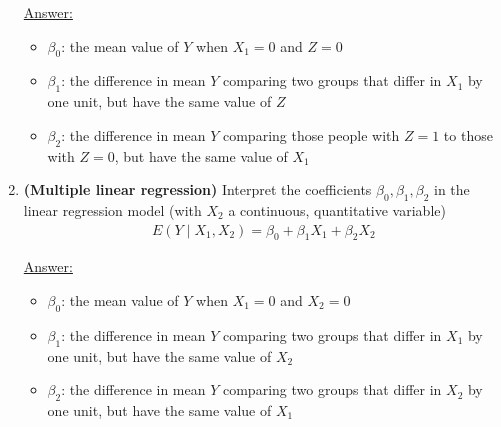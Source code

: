 \documentclass{article}
\begin{document}
\begin{enumerate}
\color{blue}
\underline{Answer:} 
\begin{itemize}
\item $\beta_0$: the mean value of $Y$ when $X_1 = 0$ and $Z = 0$
\item $\beta_1$: the difference in mean $Y$ comparing two groups that differ in $X_1$ by one unit, but have the same value of $Z$
\item $\beta_2$: the difference in mean $Y$ comparing those people with $Z = 1$ to those with $Z = 0$, but have the same value of $X_1$
\end{itemize}
\color{black}

\item \textbf{(Multiple linear regression)} Interpret the coefficients $\beta_0, \beta_1, \beta_2$ in the linear regression model (with $X_2$ a continuous, quantitative variable)
\begin{align*}
E(Y \mid X_1, X_2) = \beta_0 + \beta_1 X_1 + \beta_2 X_2
\end{align*}

\color{blue}
\underline{Answer:} 
\begin{itemize}
\item $\beta_0$: the mean value of $Y$ when $X_1 = 0$ and $X_2 = 0$
\item $\beta_1$: the difference in mean $Y$ comparing two groups that differ in $X_1$ by one unit, but have the same value of $X_2$
\item $\beta_2$: the difference in mean $Y$ comparing two groups that differ in $X_2$ by one unit, but have the same value of $X_1$
\end{itemize}
\color{black}
\end{enumerate}
\end{document}
